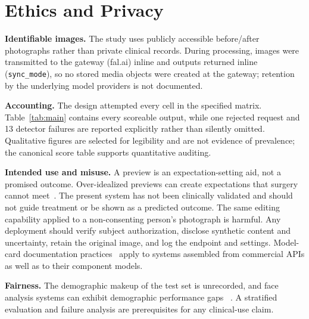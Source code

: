 \section{Ethics and Privacy}
\label{sec:ethics}

\textbf{Identifiable images.} The study uses publicly accessible before/after
photographs rather than private clinical records. During processing, images were
transmitted to the gateway (fal.ai) inline and outputs returned inline
(\texttt{sync\_mode}), so no stored media objects were created at the gateway;
retention by the underlying model providers is not documented.

\textbf{Accounting.} The design attempted every cell in the specified matrix.
Table~\ref{tab:main} contains every scoreable output, while one rejected request
and 13 detector failures are reported explicitly rather than silently omitted.
Qualitative figures are selected for legibility and are not evidence of prevalence;
the canonical score table supports quantitative auditing.

\textbf{Intended use and misuse.} A preview is an expectation-setting aid, not a
promised outcome. Over-idealized previews can create expectations that surgery
cannot meet~\cite{agarwal2007morph}. The present system has not been clinically
validated and should not guide treatment or be shown as a predicted outcome. The
same editing capability applied to a non-consenting person's photograph is
harmful. Any deployment should verify subject authorization, disclose synthetic
content and uncertainty, retain the original image, and log the endpoint and
settings. Model-card documentation practices~\cite{mitchell2019modelcards} apply
to systems assembled from commercial APIs as well as to their component models.

\textbf{Fairness.} The demographic makeup of the test set is unrecorded, and face
analysis systems can exhibit demographic performance gaps
~\cite{buolamwini2018gendershades}. A stratified evaluation and failure analysis
are prerequisites for any clinical-use claim.
